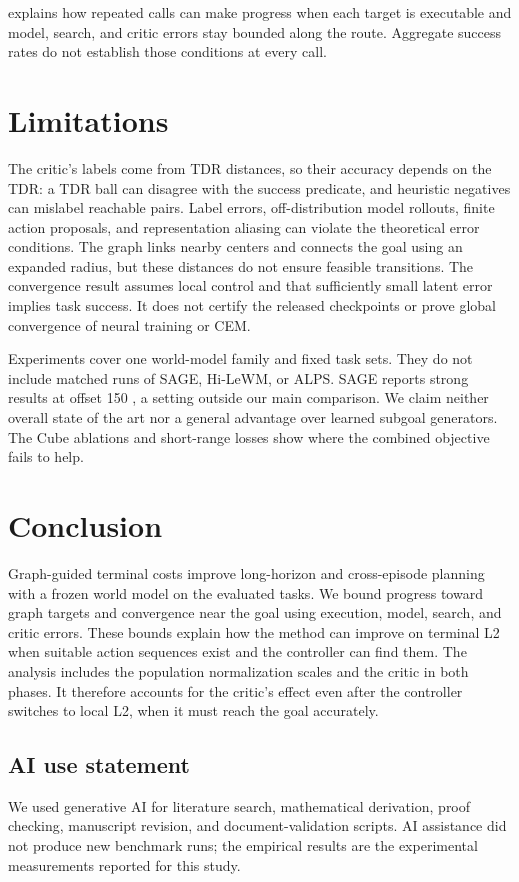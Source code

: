 \documentclass{article}
\theoremstyle{definition}
\theoremstyle{remark}
\begin{document}
 explains how repeated calls can make progress when each target
is executable and model, search, and critic errors stay bounded along the route.
Aggregate success rates do not establish those conditions at every call.

\section{Limitations}
\label{sec:limitations}
The critic's labels come from TDR distances, so their accuracy depends on the TDR:
a TDR ball can disagree with the success predicate, and heuristic negatives can mislabel reachable pairs.
Label errors, off-distribution model rollouts, finite action proposals, and
representation aliasing can violate the theoretical error conditions.
The graph links nearby centers and connects the goal using an expanded radius, but these
distances do not ensure feasible transitions. The convergence result assumes local control
and that sufficiently small latent error implies task success. It does not certify the released
checkpoints or prove global convergence of neural training or CEM.

Experiments cover one world-model family and fixed task sets. They do not include matched
runs of SAGE, Hi-LeWM, or ALPS. SAGE reports strong results at offset 150
\citep{sage}, a setting outside our main comparison. We claim neither overall state of the art
nor a general advantage over learned subgoal generators.
The Cube ablations and short-range losses show where the combined objective fails to help.

\section{Conclusion}
Graph-guided terminal costs improve long-horizon and cross-episode planning with a frozen
world model on the evaluated tasks. We bound progress toward graph targets and convergence
near the goal using execution, model, search, and critic errors. These bounds explain
how the method can improve on terminal L2 when suitable action sequences exist and
the controller can find them.
The analysis includes the population normalization scales and the critic in both phases.
It therefore accounts for the critic's effect even after the controller switches to
local L2, when it must reach the goal accurately.

\subsection*{AI use statement}
We used generative AI for literature search, mathematical derivation, proof
checking, manuscript revision, and document-validation scripts. AI assistance did not
produce new benchmark runs; the empirical results are the experimental measurements
reported for this study.
\end{document}
